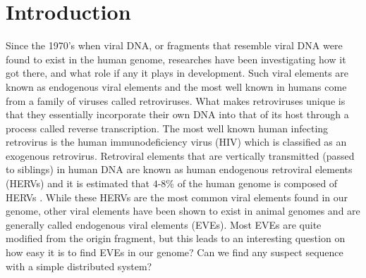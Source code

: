 

\section{Introduction}

Since the 1970’s when viral DNA, or fragments that resemble viral DNA were found to exist in the human genome, researches have been investigating how it got there, and what role if any it plays in development. Such viral elements are known as endogenous viral elements and the most well known in humans come from a family of viruses called retroviruses. What makes retroviruses unique is that they essentially incorporate their own DNA into that of its host through a process called reverse transcription. The most well known human infecting retrovirus is the human immunodeficiency virus (HIV) which is classified as an exogenous retrovirus. Retroviral elements that are vertically transmitted (passed to siblings) in human DNA are known as human endogenous retroviral elements (HERVs) and it is estimated that $4$-$8$\% of the human genome is composed of HERVs \cite{eves}. While these HERVs are the most common viral elements found in our genome, other viral elements have been shown to exist in animal genomes and are generally called endogenous viral elements (EVEs). Most EVEs are quite modified from the origin fragment, but this leads to an interesting question on how easy it is to find EVEs in our genome? Can we find any suspect sequence with a simple distributed system?